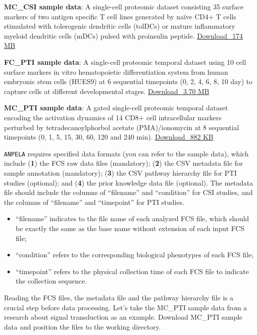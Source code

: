 \documentclass[]{article}
\providecommand{\tightlist}{%
  \setlength{\itemsep}{0pt}\setlength{\parskip}{0pt}}
\begin{document}
\textbf{MC\_CSI sample data}: A single-cell proteomic dataset consisting 35 surface markers of two antigen specific T cell lines generated by naïve CD4+ T cells stimulated with tolerogenic dendritic cells (tolDCs) or mature inflammatory myeloid dendritic cells (mDCs) pulsed with proinsulin peptide. \href{http://idrblab.cn/anpela2024/sample_data/MC_CSI.zip}{Download\_174 MB}

\textbf{FC\_PTI sample data}: A single-cell proteomic temporal dataset using 10 cell surface markers in vitro hematopoietic differentiation system from human embryonic stem cells (HUES9) at 6 sequential timepoints (0, 2, 4, 6, 8, 10 day) to capture cells at different developmental stages. \href{http://idrblab.cn/anpela2024/sample_data/FC_PTI.zip}{Download\_3.70 MB}

\textbf{MC\_PTI sample data}: A gated single-cell proteomic temporal dataset encoding the activation dynamics of 14 CD8+ cell intracellular markers perturbed by tetradecanoylphorbol acetate (PMA)/ionomycin at 8 sequential timepoints (0, 1, 5, 15, 30, 60, 120 and 240 min). \href{http://idrblab.cn/anpela2024/sample_data/MC_PTI.zip}{Download\_882 KB}

\texttt{ANPELA} requires specified data formats (you can refer to the sample data), which include (\textbf{1}) the FCS raw data files (mandatory); (\textbf{2}) the CSV metadata file for sample annotation (mandatory); (\textbf{3}) the CSV pathway hierarchy file for PTI studies (optional); and (\textbf{4}) the prior knowledge data file (optional). The metadata file should include the columns of ``filename'' and ``condition'' for CSI studies, and the columns of ``filename'' and ``timepoint'' for PTI studies.

\begin{itemize}
\tightlist
\item
  ``filename'' indicates to the file name of each analyzed FCS file, which should be exactly the same as the base name without extension of each input FCS file;
\item
  ``condition'' refers to the corresponding biological phenotypes of each FCS file;
\item
  ``timepoint'' refers to the physical collection time of each FCS file to indicate the collection sequence.
\end{itemize}

Reading the FCS files, the metadata file and the pathway hierarchy file is a crucial step before data processing. Let's take the MC\_PTI sample data from a research about signal transduction as an example. Download MC\_PTI sample data and position the files to the working directory.
\end{document}
